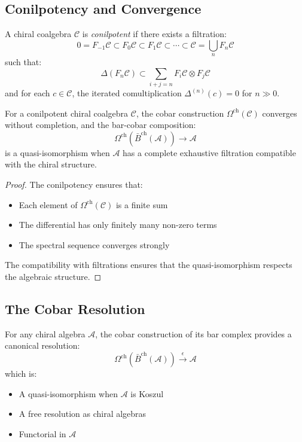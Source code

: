 \subsection{Conilpotency and Convergence}

\begin{definition}\label{def:conilpotent}
A chiral coalgebra $\mathcal{C}$ is \emph{conilpotent} if there exists a filtration:
\[
0 = F_{-1}\mathcal{C} \subset F_0\mathcal{C} \subset F_1\mathcal{C} \subset \cdots \subset \mathcal{C} = \bigcup_n F_n\mathcal{C}
\]
such that:
\[
\Delta(F_n\mathcal{C}) \subset \sum_{i+j=n} F_i\mathcal{C} \otimes F_j\mathcal{C}
\]
and for each $c \in \mathcal{C}$, the iterated comultiplication $\Delta^{(n)}(c) = 0$ for $n \gg 0$.
\end{definition}

\begin{theorem}\label{thm:cobar-convergence}
For a conilpotent chiral coalgebra $\mathcal{C}$, the cobar construction $\Omega^{\text{ch}}(\mathcal{C})$ converges without completion, and the bar-cobar composition:
\[
\Omega^{\text{ch}}(\bar{B}^{\text{ch}}(\mathcal{A})) \to \mathcal{A}
\]
is a quasi-isomorphism when $\mathcal{A}$ has a complete exhaustive filtration compatible with the chiral structure.
\end{theorem}

\begin{proof}
The conilpotency ensures that:
\begin{itemize}
\item Each element of $\Omega^{\text{ch}}(\mathcal{C})$ is a finite sum
\item The differential has only finitely many non-zero terms
\item The spectral sequence converges strongly
\end{itemize}
The compatibility with filtrations ensures that the quasi-isomorphism respects the algebraic structure.
\end{proof}

\subsection{The Cobar Resolution}

\begin{theorem}\label{thm:cobar-resolution}
For any chiral algebra $\mathcal{A}$, the cobar construction of its bar complex provides a canonical resolution:
\[
\Omega^{\text{ch}}(\bar{B}^{\text{ch}}(\mathcal{A})) \xrightarrow{\epsilon} \mathcal{A}
\]
which is:
\begin{itemize}
\item A quasi-isomorphism when $\mathcal{A}$ is Koszul
\item A free resolution as chiral algebras
\item Functorial in $\mathcal{A}$
\end{itemize}
\end{theorem}


